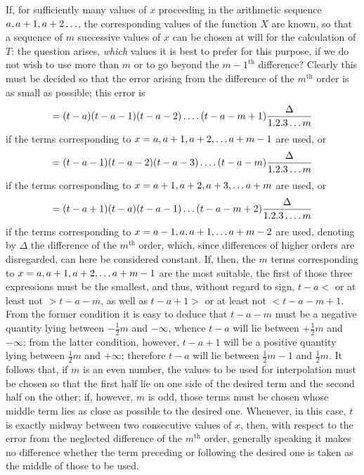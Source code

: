 If, for sufficiently many values of \(x\) proceeding in the arithmetic sequence
\(a,a+1,a+2\mathinner{.\,.\,.}\), the corresponding values of the function \(X\) are known, so that a sequence of \(m\)
successive values of \(x\) can be chosen at will for the calculation of \(T\):
the question arises, \emph{which} values it is best to prefer for this purpose, if we do not wish to use more than \(m\) or to go beyond the \(m-1^{\mathrm{th}}\) difference?
Clearly this must be decided so that the error arising from the difference of the \(m^{\mathrm{th}}\) order is
as small as possible; this error is
\[
=(t-a)(t-a-1)(t-a-2)\mathinner{.\,.\,.\,.}(t-a-m+1)\frac{\Delta}{1.2.3\mathinner{.\,.\,.} m}
\]
if the terms corresponding to \(x=a,a+1,a+2,\mathinner{.\,.\,.} a+m-1\) are used, or
\[
=(t-a-1)(t-a-2)(t-a-3)\mathinner{.\,.\,.\,.}(t-a-m)\frac{\Delta}{1.2.3\mathinner{.\,.\,.} m}
\]
if the terms corresponding to \(x=a+1,a+2,a+3,\mathinner{.\,.\,.} a+m\) are used, or
\[
=(t-a+1)(t-a)(t-a-1)\mathinner{.\,.\,.}(t-a-m+2)\frac{\Delta}{1.2.3\mathinner{.\,.\,.\,.}m}
\]
if the terms corresponding to \(x=a-1,a,a+1,\mathinner{.\,.\,.} a+m-2\) are used, denoting
by \(\Delta\) the difference of the \(m^{\mathrm{th}}\) order, which, since differences of higher orders
are disregarded, can here be considered constant. If, then, the \(m\) terms
corresponding to \(x=a,a+1,a+2,\mathinner{.\,.\,.} a+m-1\) are the most suitable, the first of those
three expressions must be the smallest, and thus, without regard to sign, \(t-a<\)
or at least not \(>t-a-m\), as well as \(t-a+1>\) or at least not \(<t-a-m+1\).
From the former condition it is easy to deduce that \(t-a-m\) must be a negative quantity lying between \(-\frac12m\) and \(-\infty\), whence \(t-a\) will lie between \(+\frac12m\) and \(-\infty\); from
the latter condition, however, \(t-a+1\) will be a positive quantity lying between \(\frac12m\) and
\(+\infty\); therefore \(t-a\) will lie between \(\frac12m-1\) and \(\frac12m\). It follows that, if \(m\) is an even number, the values to be used for interpolation must be chosen so that
the first half lie on one side of the desired term and the second half on the other; if, however,
\(m\) is odd, those terms must be chosen whose middle term lies as close as possible to the desired one.
Whenever, in this case, \(t\) is exactly midway between two consecutive values of \(x\), then, with respect to the error from the neglected difference of the \(m^{\mathrm{th}}\) order, generally speaking it makes no difference whether the term preceding or following the desired one is taken as the middle
of those to be used.

